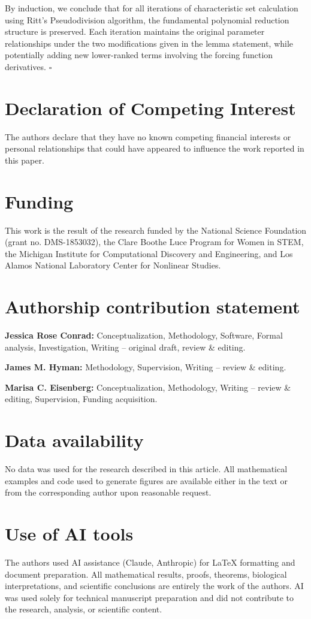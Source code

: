 \documentclass[a4paper,fleqn]{cas-dc}
\theoremstyle{definition}
\begin{document}
\begin{pf}
    By induction, we conclude that for all iterations of characteristic set calculation using Ritt's Pseudodivision algorithm, the fundamental polynomial reduction structure is preserved. Each iteration maintains the original parameter relationships under the two modifications given in the lemma statement, while potentially adding new lower-ranked terms involving the forcing function derivatives. $\square$
\end{pf}


\section*{Declaration of Competing Interest}
The authors declare that they have no known competing financial interests or personal relationships that could have appeared to influence the work reported in this paper.

\section*{Funding}
This work is the result of the research funded by the National Science Foundation  (grant no. DMS-1853032), the Clare Boothe Luce Program for Women in STEM, the Michigan Institute for Computational Discovery and Engineering, and Los Alamos National Laboratory Center for Nonlinear Studies.

\section*{Authorship contribution statement}
\textbf{Jessica Rose Conrad:} Conceptualization, Methodology, Software, Formal analysis, Investigation, Writing -- original draft, review \& editing.

\textbf{James M. Hyman:}  Methodology, Supervision, Writing -- review \& editing.

\textbf{Marisa C. Eisenberg:} Conceptualization, Methodology, Writing -- review \& editing, Supervision, Funding acquisition.

\section*{Data availability}
No data was used for the research described in this article. All mathematical examples and code used to generate figures are available either in the text or from the corresponding author upon reasonable request.

\section*{Use of AI tools}
The authors used AI assistance (Claude, Anthropic) for LaTeX formatting and document preparation. All mathematical results, proofs, theorems, biological interpretations, and scientific conclusions are entirely the work of the authors. AI was used solely for technical manuscript preparation and did not contribute to the research, analysis, or scientific content.
\end{document}
